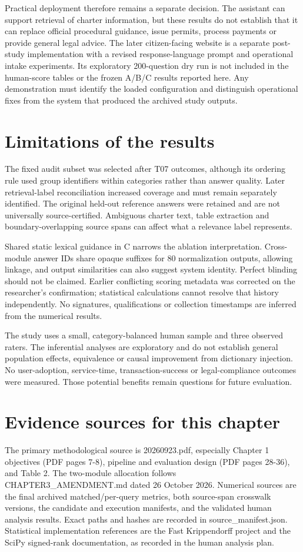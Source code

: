 Practical deployment therefore remains a separate decision. The assistant can support retrieval of charter information, but these results do not establish that it can replace official procedural guidance, issue permits, process payments or provide general legal advice. The later citizen-facing website is a separate post-study implementation with a revised response-language prompt and operational intake experiments. Its exploratory 200-question dry run is not included in the human-score tables or the frozen A/B/C results reported here. Any demonstration must identify the loaded configuration and distinguish operational fixes from the system that produced the archived study outputs.


\section{Limitations of the results}

The fixed audit subset was selected after T07 outcomes, although its ordering rule used group identifiers within categories rather than answer quality. Later retrieval-label reconciliation increased coverage and must remain separately identified. The original held-out reference answers were retained and are not universally source-certified. Ambiguous charter text, table extraction and boundary-overlapping source spans can affect what a relevance label represents.


Shared static lexical guidance in C narrows the ablation interpretation. Cross-module answer IDs share opaque suffixes for 80 normalization outputs, allowing linkage, and output similarities can also suggest system identity. Perfect blinding should not be claimed. Earlier conflicting scoring metadata was corrected on the researcher's confirmation; statistical calculations cannot resolve that history independently. No signatures, qualifications or collection timestamps are inferred from the numerical results.


The study uses a small, category-balanced human sample and three observed raters. The inferential analyses are exploratory and do not establish general population effects, equivalence or causal improvement from dictionary injection. No user-adoption, service-time, transaction-success or legal-compliance outcomes were measured. Those potential benefits remain questions for future evaluation.


\section{Evidence sources for this chapter}

The primary methodological source is 20260923.pdf, especially Chapter 1 objectives (PDF pages 7-8), pipeline and evaluation design (PDF pages 28-36), and Table 2. The two-module allocation follows CHAPTER3\_AMENDMENT.md dated 26 October 2026. Numerical sources are the final archived matched/per-query metrics, both source-span crosswalk versions, the candidate and execution manifests, and the validated human analysis results. Exact paths and hashes are recorded in source\_manifest.json. Statistical implementation references are the Fast Krippendorff project and the SciPy signed-rank documentation, as recorded in the human analysis plan.
